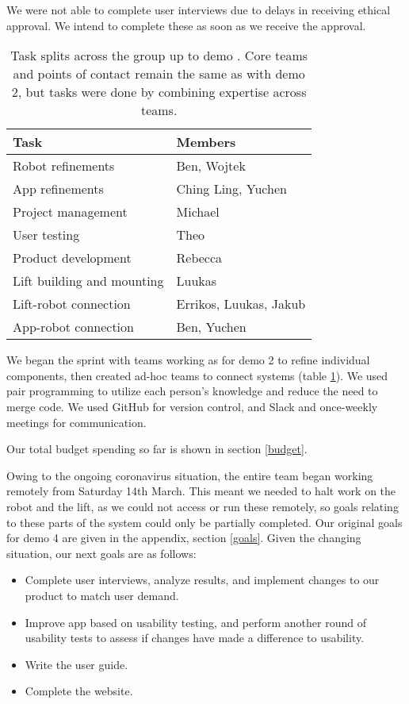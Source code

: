 \documentclass{article}
\begin{document}
We were not able to complete user interviews due to delays in receiving ethical approval. We intend to complete these as soon as we receive the approval. 

\begin{table}[]
  \begin{tabular}{l|l}
    Task & Members \\
    \hline
    Robot refinements & Ben, Wojtek \\
    App refinements & Ching Ling, Yuchen \\
    Project management & Michael \\
    User testing & Theo \\
    Product development & Rebecca \\
    Lift building and mounting & Luukas \\
    Lift-robot connection & Errikos, Luukas, Jakub \\
    App-robot connection & Ben, Yuchen \\
  \end{tabular}
  \caption{Task splits across the group up to demo \demoNumber. Core teams and points of contact remain the same as with demo 2, but tasks were done by combining expertise across teams. }
  \label{tab:group-split}
\end{table}

We began the sprint with teams working as for demo 2 to refine individual components, then created ad-hoc teams to connect systems (table \ref{tab:group-split}). We used pair programming to utilize each person's knowledge and reduce the need to merge code. We used GitHub for version control, and Slack and once-weekly meetings for communication.

Our total budget spending so far is shown in section \ref{budget}.

Owing to the ongoing coronavirus situation, the entire team began working remotely from Saturday 14th March. This meant we needed to halt work on the robot and the lift, as we could not access or run these remotely, so goals relating to these parts of the system could only be partially completed. Our original goals for demo 4 are given in the appendix, section \ref{goals}. Given the changing situation, our next goals are as follows:
\begin{itemize}
  \item Complete user interviews, analyze results, and implement changes to our product to match user demand.
  \item Improve app based on usability testing, and perform another round of usability tests to assess if changes have made a difference to usability. 
  \item Write the user guide. 
  \item Complete the website. 
\end{itemize}
\end{document}
